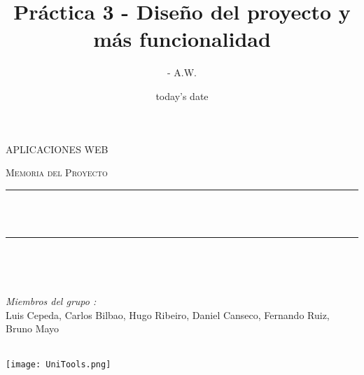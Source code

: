 \documentclass[12pt]{report}
\title{Práctica 3 - Diseño del proyecto y más funcionalidad}
\author{- A.W.}
\date{today's date}
\makeatletter
\let\thetitle\@title
\makeatother
\begin{document}

\begin{titlepage}
	\centering
    \vspace*{0.5 cm}
\begin{center}    \textsc{\Large  APLICACIONES WEB}\\[2.0 cm]	\end{center}%
	\textsc{\Large Memoria del Proyecto }\\[0.5 cm]				%
	\rule{\linewidth}{0.2 mm} \\[0.4 cm]
	{ \huge \bfseries \thetitle}\\
	\rule{\linewidth}{0.2 mm} \\[1.5 cm]
	
	\begin{minipage}{0.4\textwidth}
		\begin{flushleft} \large
			\end{flushleft}
			\end{minipage}~
			\begin{minipage}{0.4\textwidth}
            
			\begin{flushright} \large
			\emph{Miembros del grupo :} \\
			Luis Cepeda, Carlos Bilbao,
			Hugo Ribeiro, Daniel Canseco,
			Fernando Ruiz, Bruno Mayo
			
		\end{flushright}
           
	\end{minipage}\\[2 cm]
	
	\texttt{[image: UniTools.png]}

\end{titlepage}


\tableofcontents
\pagebreak

\renewcommand{\thesection}{\arabic{section}}
\end{document}
